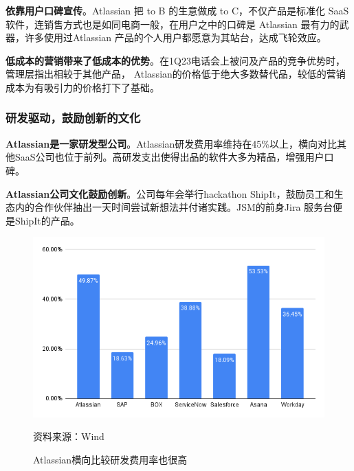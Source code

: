 \textbf{依靠用户口碑宣传}。Atlassian 把 to B 的生意做成 to C，不仅产品是标准化 SaaS 软件，连销售方式也是如同电商一般，在用户之中的口碑是 Atlassian 最有力的武器，许多使用过Atlassian 产品的个人用户都愿意为其站台，达成飞轮效应。

\textbf{低成本的营销带来了低成本的优势}。在1Q23电话会上被问及产品的竞争优势时，管理层指出相较于其他产品， Atlassian的价格低于绝大多数替代品，较低的营销成本为有吸引力的价格打下了基础。

\subsubsection{研发驱动，鼓励创新的文化}

\textbf{Atlassian是一家研发型公司}。Atlassian研发费用率维持在45\%以上，横向对比其他SaaS公司也位于前列。高研发支出使得出品的软件大多为精品，增强用户口碑。

\textbf{Atlassian公司文化鼓励创新}。公司每年会举行hackathon ShipIt，鼓励员工和生态内的合作伙伴抽出一天时间尝试新想法并付诸实践。JSM的前身Jira 服务台便是ShipIt的产品。
\begin{figure}[H]
    \caption{Atlassian横向比较研发费用率也很高}
    \begin{center}
        \includegraphics[width=0.9\linewidth]{img/RD.png}
    \end{center}
    \footnotesize{资料来源：Wind}
\end{figure}
